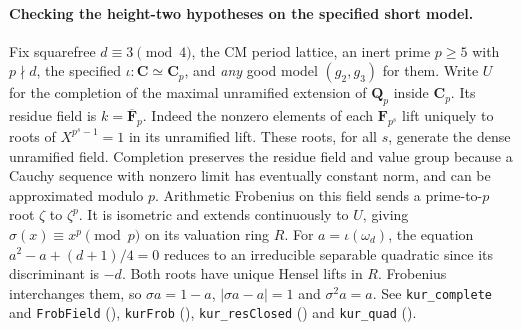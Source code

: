 \paragraph{Checking the height-two hypotheses on the specified short model.}
Fix squarefree $d\equiv3\pmod4$, the CM period lattice, an inert prime $p\geq5$ with $p\nmid d$,
the specified $\iota:\mathbf C\simeq\mathbf C_p$, and \emph{any}
good model $(g_2,g_3)$ for them. Write $U$ for the completion of the
maximal unramified extension of $\mathbf Q_p$ inside $\mathbf C_p$.
Its residue field is $k=\overline{\mathbf F}_p$. Indeed the nonzero
elements of each $\mathbf F_{p^s}$ lift uniquely to roots of
$X^{p^s-1}=1$ in its unramified lift. These roots, for all $s$,
generate the dense unramified field. Completion preserves the residue
field and value group because a Cauchy sequence with nonzero limit has
eventually constant norm, and can be approximated modulo $p$.
Arithmetic Frobenius on this field sends a prime-to-$p$ root $\zeta$
to $\zeta^p$. It is isometric and extends continuously to $U$, giving
$\sigma(x)\equiv x^p\pmod p$ on its valuation ring $R$.
For $a=\iota(\omega_d)$, the equation $a^2-a+(d+1)/4=0$ reduces to
an irreducible separable quadratic since its discriminant is $-d$.
Both roots have unique Hensel lifts in $R$. Frobenius interchanges
them, so $\sigma a=1-a$, $|\sigma a-a|=1$ and $\sigma^2 a=a$.
See \nolinkurl{kur_complete} and \nolinkurl{FrobField}
(), \nolinkurl{kurFrob}
(), \nolinkurl{kur_resClosed}
() and \nolinkurl{kur_quad}
().

